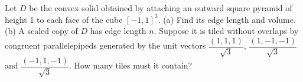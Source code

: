 Let $D$ be the convex solid obtained by attaching an outward square pyramid of height 1 to each face of the cube $[-1,1]^3$. (a) Find its edge length and volume. (b) A scaled copy of $D$ has edge length $n$. Suppose it is tiled without overlaps by congruent parallelepipeds generated by the unit vectors $\dfrac{(1,1,1)}{\sqrt3}$, $\dfrac{(1,-1,-1)}{\sqrt3}$ and $\dfrac{(-1,1,-1)}{\sqrt3}$. How many tiles must it contain?
